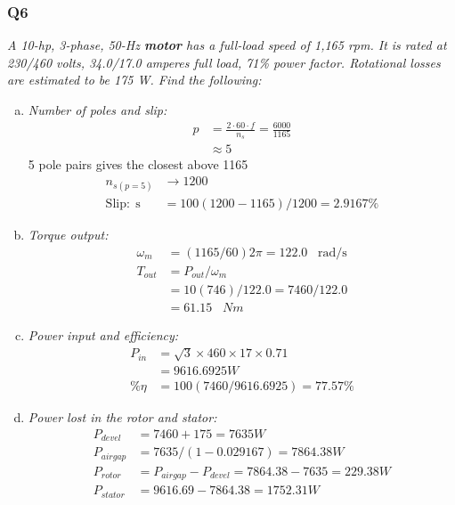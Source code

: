 \documentclass[a4paper,11pt]{article}
\begin{document}
\subsubsection*{Q6}

\textit{A 10-hp, 3-phase, 50-Hz \textbf{motor} has a full-load speed of 1,165 rpm. It is rated at 230/460 volts, 34.0/17.0 amperes full load, 71\% power factor. Rotational losses are estimated to be 175 W. Find the following:}

\begin{enumerate}[a)]
    \item \textit{Number of poles and slip:}\\
    \begin{align*}
        p &= \frac{2\cdot 60 \cdot f}{n_s} = \frac{6000}{1165}\\
        &\approx 5
    \end{align*}
    5 pole pairs gives the closest above 1165
    \begin{align*}
        n_{s(p=5)}&\rightarrow1200 \\
        \mathrm{Slip:\;s}&=100(1200-1165)/1200=2.9167\%
    \end{align*}

    \item \textit{Torque output:}\\
    \begin{align*}
        \omega_m &= (1165/60)2\pi = 122.0\;\;\; \mathrm{rad/s} \\
        T_{out} &= P_{out}/\omega_m \\
        &= 10(746)/122.0 = 7460/122.0
        \\&=61.15\;\;\;Nm
    \end{align*}

    \item \textit{Power input and efficiency:}\\
    \begin{align*}
        P_{in} &= \sqrt{3}\times460\times17\times0.71\\
        &=9616.6925W\\
        \%\eta &= 100(7460/9616.6925)=77.57\%
    \end{align*}

    \item \textit{Power lost in the rotor and stator:}\\
    \begin{align*}
        P_{devel} &= 7460+175=7635W\\ 
        P_{airgap} &= 7635/(1-0.029167)=7864.38W \\
        P_{rotor} &= P_{airgap}-P_{devel} = 7864.38-7635=229.38W \\
        P_{stator} &= 9616.69-7864.38=1752.31W\\\\
    \end{align*}
\end{enumerate}
\end{document}
